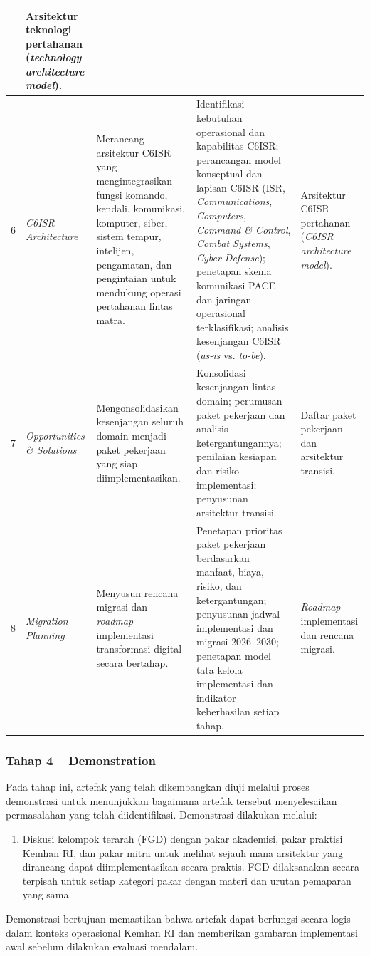 \begin{longtable}{|c|p{2.4cm}|p{3cm}|p{3.6cm}|p{2.8cm}|}
& Arsitektur teknologi pertahanan (\textit{technology architecture model}). \\
\hline
6 & \textit{C6ISR Architecture} & Merancang arsitektur C6ISR yang mengintegrasikan fungsi komando, kendali, komunikasi, komputer, siber, sistem tempur, intelijen, pengamatan, dan pengintaian untuk mendukung operasi pertahanan lintas matra.
& Identifikasi kebutuhan operasional dan kapabilitas C6ISR; perancangan model konseptual dan lapisan C6ISR (ISR, \textit{Communications}, \textit{Computers}, \textit{Command \& Control}, \textit{Combat Systems}, \textit{Cyber Defense}); penetapan skema komunikasi PACE dan jaringan operasional terklasifikasi; analisis kesenjangan C6ISR (\textit{as-is} vs. \textit{to-be}).
& Arsitektur C6ISR pertahanan (\textit{C6ISR architecture model}). \\
\hline
7 & \textit{Opportunities \& Solutions} & Mengonsolidasikan kesenjangan seluruh domain menjadi paket pekerjaan yang siap diimplementasikan.
& Konsolidasi kesenjangan lintas domain; perumusan paket pekerjaan dan analisis ketergantungannya; penilaian kesiapan dan risiko implementasi; penyusunan arsitektur transisi.
& Daftar paket pekerjaan dan arsitektur transisi. \\
\hline
8 & \textit{Migration Planning} & Menyusun rencana migrasi dan \textit{roadmap} implementasi transformasi digital secara bertahap.
& Penetapan prioritas paket pekerjaan berdasarkan manfaat, biaya, risiko, dan ketergantungan; penyusunan jadwal implementasi dan migrasi 2026--2030; penetapan model tata kelola implementasi dan indikator keberhasilan setiap tahap.
& \textit{Roadmap} implementasi dan rencana migrasi. \\
\hline
\end{longtable}

\subsubsection{Tahap 4 – Demonstration}
Pada tahap ini, artefak yang telah dikembangkan diuji melalui proses demonstrasi untuk menunjukkan bagaimana artefak tersebut menyelesaikan permasalahan yang telah diidentifikasi. Demonstrasi dilakukan melalui:
\begin{enumerate}
  \item Diskusi kelompok terarah (FGD) dengan pakar akademisi, pakar praktisi Kemhan RI, dan pakar mitra untuk melihat sejauh mana arsitektur yang dirancang dapat diimplementasikan secara praktis.
  FGD dilaksanakan secara terpisah untuk setiap kategori pakar dengan materi dan urutan pemaparan yang sama.
\end{enumerate}
Demonstrasi bertujuan memastikan bahwa artefak dapat berfungsi secara logis dalam konteks operasional Kemhan RI dan memberikan gambaran implementasi awal sebelum dilakukan evaluasi mendalam.

